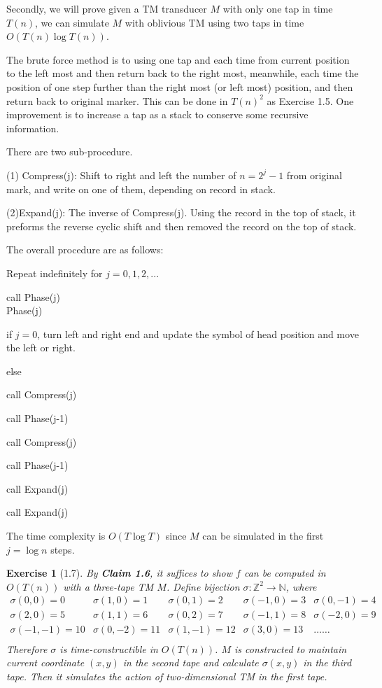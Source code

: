 \documentclass[a4paper]{article}
\newtheorem*{exercise}{Exercise}
\begin{document}
Secondly, we will prove given a TM transducer $M$ with only one tap in time $T(n)$, we can simulate $M$ with oblivious TM using two taps in time $O(T(n)\log T(n))$.

The brute force method is to using one tap and each time from current position to the left  most and then return back to the right most, meanwhile, each time the position of one step further than the right most (or left most) position, and then return back to original marker. This can be done in $T(n)^{2}$ as Exercise 1.5. One improvement is to increase a tap as a stack to conserve some recursive information.

There are two sub-procedure.

(1) Compress(j): Shift to right and left the number of $n = 2^{j} - 1$ from original mark, and write on one of them, depending on record in stack.

(2)Expand(j): The inverse of Compress(j). Using the record in the top of stack, it preforms the reverse cyclic shift and then removed the record on the top of stack.

The overall procedure are as follows:

Repeat indefinitely for $j = 0, 1, 2, ...$

call Phase(j)\\
Phase(j)

\quad if $j = 0$, turn left and right end and update the symbol of head position and move the left or right.

\quad else 

\quad \quad call Compress(j)

\quad \quad call Phase(j-1)

\quad \quad call Compress(j)

\quad \quad call Phase(j-1)

\quad \quad call Expand(j)

\quad \quad call Expand(j)

The time complexity is $O(T\log T)$ since $M$ can be simulated in the first $j = \log n$ steps.

\begin{exercise}[1.7]
    By \textbf{Claim 1.6}, it suffices to show $f$ can be computed in $O(T(n))$ with a three-tape TM $M$.
    Define bijection $\sigma:\mathbb Z^2\to\mathbb N$, where
    $$
    \begin{matrix}
        \sigma(0,0)=0 & \sigma(1,0)=1 & \sigma(0,1)=2 & \sigma(-1,0)=3 & \sigma(0,-1)=4\\
        \sigma(2,0)=5 & \sigma(1,1)=6 & \sigma(0,2)=7 & \sigma(-1,1)=8 & \sigma(-2,0)=9\\
        \sigma(-1,-1)=10 & \sigma(0,-2)=11 & \sigma(1,-1)=12 & \sigma(3,0)=13 & \dots\dots\\
    \end{matrix}
    $$
    Therefore $\sigma$ is time-constructible in $O(T(n))$.
    $M$ is constructed to maintain current coordinate $(x,y)$ in the second tape 
    and calculate $\sigma(x,y)$ in the third tape.
    Then it simulates the action of two-dimensional TM in the first tape.
\end{exercise}
\end{document}
